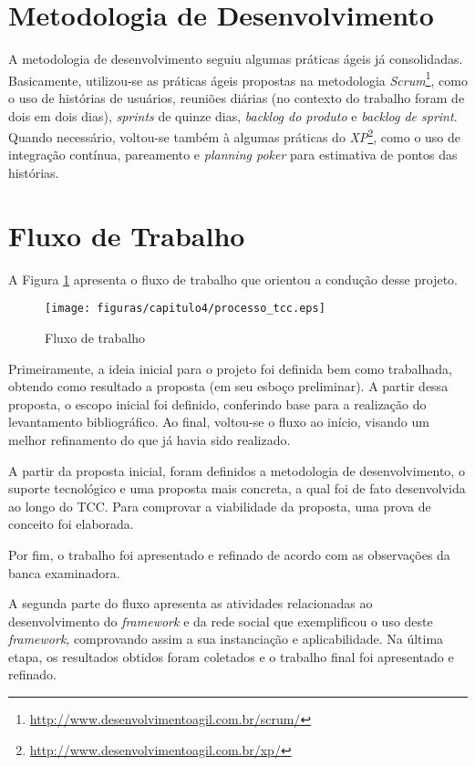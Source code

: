 \section{Metodologia de Desenvolvimento}

A metodologia de desenvolvimento seguiu algumas práticas ágeis já consolidadas. Basicamente, utilizou-se as práticas ágeis propostas na metodologia \textit{Scrum}\footnote{\url{http://www.desenvolvimentoagil.com.br/scrum/}}, como o uso de histórias de usuários, reuniões diárias (no contexto do trabalho foram de dois em dois dias), \textit{sprints} de quinze dias, \textit{backlog do produto} e \textit{backlog de sprint}. Quando necessário, voltou-se também à algumas práticas do \textit{XP}\footnote{\url{http://www.desenvolvimentoagil.com.br/xp/}}, como o uso de integração contínua, pareamento e \textit{planning poker} para estimativa de pontos das histórias.

\section{Fluxo de Trabalho}

A Figura \ref{processo tcc} apresenta o fluxo de trabalho que orientou a condução desse projeto.

\begin{figure}[h]
	\centering
	\texttt{[image: figuras/capitulo4/processo\_tcc.eps]}
	\caption{Fluxo de trabalho}
	\label{processo tcc}
\end{figure}

Primeiramente, a ideia inicial para o projeto foi definida bem como trabalhada, obtendo como resultado a proposta (em seu esboço preliminar). A partir dessa proposta, o escopo inicial foi definido, conferindo base para a realização do levantamento bibliográfico. Ao final, voltou-se o fluxo ao início, visando um melhor refinamento do que já havia sido realizado.

A partir da proposta inicial, foram definidos a metodologia de desenvolvimento, o suporte tecnológico e uma proposta mais concreta, a qual foi de fato desenvolvida ao longo do TCC. Para comprovar a viabilidade da proposta, uma prova de conceito foi elaborada.

Por fim, o trabalho foi apresentado e refinado de acordo com as observações da banca examinadora.

A segunda parte do fluxo apresenta as atividades relacionadas ao desenvolvimento do \textit{framework} e da rede social que exemplificou o uso deste \textit{framework}, comprovando assim a sua instanciação e aplicabilidade. Na última etapa, os resultados obtidos foram coletados e o trabalho final foi apresentado e refinado.

